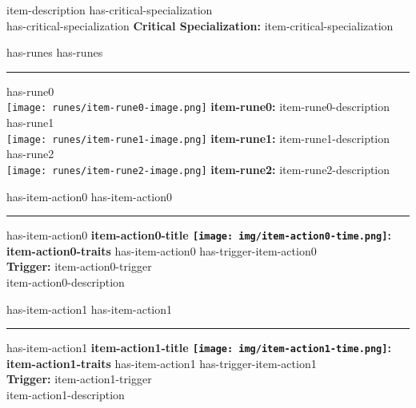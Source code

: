 \documentclass{article}
\begin{document}
        item-description
        has-critical-specialization \\
        has-critical-specialization \textbf{Critical Specialization:} item-critical-specialization

        has-runes \vspace{1.25mm}
        has-runes \rule{\textwidth}{0.5pt}
        has-rune0 \\ \texttt{[image: runes/item-rune0-image.png]} \textbf{item-rune0:} item-rune0-description
        has-rune1 \\ \texttt{[image: runes/item-rune1-image.png]} \textbf{item-rune1:} item-rune1-description
        has-rune2 \\ \texttt{[image: runes/item-rune2-image.png]} \textbf{item-rune2:} item-rune2-description
        
        has-item-action0 \vspace{1.25mm}
        has-item-action0 \rule{\textwidth}{0.5pt}
        has-item-action0 \textbf{item-action0-title \texttt{[image: img/item-action0-time.png]}: item-action0-traits}  
        has-item-action0 has-trigger-item-action0 \\ \textbf{Trigger:} item-action0-trigger\\
        item-action0-description

        has-item-action1 \vspace{1.25mm}
        has-item-action1 \rule{\textwidth}{0.5pt}
        has-item-action1 \textbf{item-action1-title \texttt{[image: img/item-action1-time.png]}: item-action1-traits}  
        has-item-action1 has-trigger-item-action1 \\ \textbf{Trigger:} item-action1-trigger\\
        item-action1-description

    \endgroup
\end{document}
